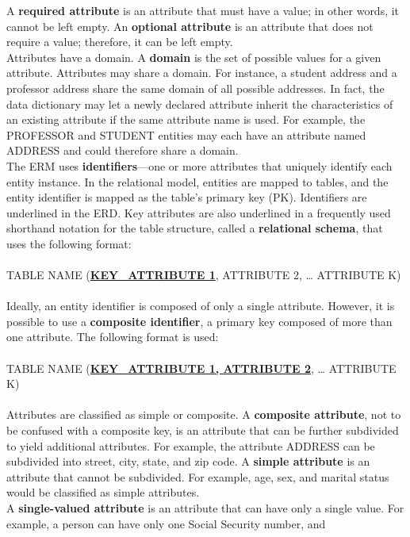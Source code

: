 \documentclass[a4paper, 12pt, titlepage]{report}
\begin{document}
{\noindent A \textbf{required attribute} is an attribute that must have a value; in other words, it cannot be left empty. An \textbf{optional attribute} is an attribute that does not require a value; therefore, it can be left empty.\\
Attributes have a domain. A \textbf{domain} is the set of possible values for a given attribute. Attributes may share a domain. For instance, a student address and a professor
address share the same domain of all possible addresses. In fact, the data dictionary may let a newly declared attribute inherit the characteristics of an existing attribute if the
same attribute name is used. For example, the PROFESSOR and STUDENT entities may each have an attribute named ADDRESS and could therefore share a domain.\\
The ERM uses \textbf{identifiers}—one or more attributes that uniquely identify each entity instance. In the relational model, entities are mapped to tables, and the entity identifier is mapped as the table’s primary key (PK). Identifiers are underlined in the ERD. Key attributes are also underlined in a frequently used shorthand notation for the table structure, called a \textbf{relational schema}, that uses the following format:\\ \\
TABLE NAME (\uline{\textbf{{KEY\_ATTRIBUTE 1}}}, ATTRIBUTE 2, … ATTRIBUTE K)\\ \\
Ideally, an entity identifier is composed of only a single attribute. However, it is possible to use a \textbf{composite identifier}, a primary key composed of more than one attribute. The following format is used:\\ \\
TABLE NAME (\uline{\textbf{{KEY\_ATTRIBUTE 1, ATTRIBUTE 2}}}, … ATTRIBUTE K)\\ \\
Attributes are classified as simple or composite. A \textbf{composite attribute}, not to be confused with a composite key, is an attribute that can be further subdivided to yield additional attributes. For example, the attribute ADDRESS can be subdivided into street, city, state, and zip code. A \textbf{simple attribute} is an attribute that cannot be subdivided. For example, age, sex, and marital status would be classified as simple attributes.\\
A \textbf{single-valued attribute} is an attribute that can have only a single value. For example, a person can have only one Social Security number, and
}
\end{document}
